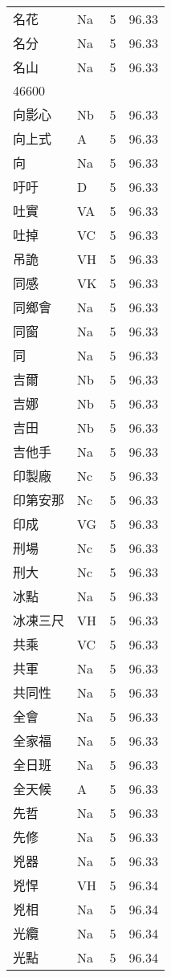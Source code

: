 \documentclass[twocolumn]{book}
\begin{document}
\begin{supertabular}{llrr}
名花 & Na & 5 &  96.33\\
名分 & Na & 5 &  96.33\\
名山 & Na & 5 &  96.33\\
46600\\
向影心 & Nb & 5 &  96.33\\
向上式 & A & 5 &  96.33\\
向 & Na & 5 &  96.33\\
吁吁 & D & 5 &  96.33\\
吐實 & VA & 5 &  96.33\\
吐掉 & VC & 5 &  96.33\\
吊詭 & VH & 5 &  96.33\\
同感 & VK & 5 &  96.33\\
同鄉會 & Na & 5 &  96.33\\
同窗 & Na & 5 &  96.33\\
同 & Na & 5 &  96.33\\
吉爾 & Nb & 5 &  96.33\\
吉娜 & Nb & 5 &  96.33\\
吉田 & Nb & 5 &  96.33\\
吉他手 & Na & 5 &  96.33\\
印製廠 & Nc & 5 &  96.33\\
印第安那 & Nc & 5 &  96.33\\
印成 & VG & 5 &  96.33\\
刑場 & Nc & 5 &  96.33\\
刑大 & Nc & 5 &  96.33\\
冰點 & Na & 5 &  96.33\\
冰凍三尺 & VH & 5 &  96.33\\
共乘 & VC & 5 &  96.33\\
共軍 & Na & 5 &  96.33\\
共同性 & Na & 5 &  96.33\\
全會 & Na & 5 &  96.33\\
全家福 & Na & 5 &  96.33\\
全日班 & Na & 5 &  96.33\\
全天候 & A & 5 &  96.33\\
先哲 & Na & 5 &  96.33\\
先修 & Na & 5 &  96.33\\
兇器 & Na & 5 &  96.33\\
兇悍 & VH & 5 &  96.34\\
兇相 & Na & 5 &  96.34\\
光纜 & Na & 5 &  96.34\\
光點 & Na & 5 &  96.34\\

\end{supertabular}
\end{document}
